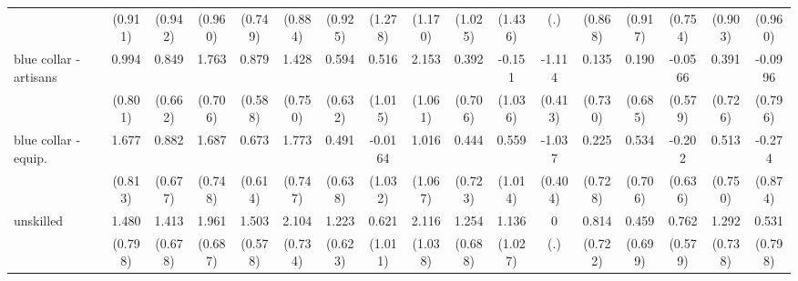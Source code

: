{\begin{tabular}{l*{16}{c}}
                    &     (0.911)         &     (0.942)         &     (0.960)         &     (0.749)         &     (0.884)         &     (0.925)         &     (1.278)         &     (1.170)         &     (1.025)         &     (1.436)         &         (.)         &     (0.868)         &     (0.917)         &     (0.754)         &     (0.903)         &     (0.960)         \\
[1em]
blue collar - artisans&       0.994         &       0.849         &       1.763\sym{*}  &       0.879         &       1.428         &       0.594         &       0.516         &       2.153\sym{*}  &       0.392         &      -0.151         &      -1.114\sym{**} &       0.135         &       0.190         &     -0.0566         &       0.391         &     -0.0996         \\
                    &     (0.801)         &     (0.662)         &     (0.706)         &     (0.588)         &     (0.750)         &     (0.632)         &     (1.015)         &     (1.061)         &     (0.706)         &     (1.036)         &     (0.413)         &     (0.730)         &     (0.685)         &     (0.579)         &     (0.726)         &     (0.796)         \\
[1em]
blue collar - equip.&       1.677\sym{*}  &       0.882         &       1.687\sym{*}  &       0.673         &       1.773\sym{*}  &       0.491         &     -0.0164         &       1.016         &       0.444         &       0.559         &      -1.037\sym{*}  &       0.225         &       0.534         &      -0.202         &       0.513         &      -0.274         \\
                    &     (0.813)         &     (0.677)         &     (0.748)         &     (0.614)         &     (0.747)         &     (0.638)         &     (1.032)         &     (1.067)         &     (0.723)         &     (1.014)         &     (0.404)         &     (0.728)         &     (0.706)         &     (0.636)         &     (0.750)         &     (0.874)         \\
[1em]
unskilled           &       1.480         &       1.413\sym{*}  &       1.961\sym{**} &       1.503\sym{**} &       2.104\sym{**} &       1.223\sym{*}  &       0.621         &       2.116\sym{*}  &       1.254         &       1.136         &           0         &       0.814         &       0.459         &       0.762         &       1.292         &       0.531         \\
                    &     (0.798)         &     (0.678)         &     (0.687)         &     (0.578)         &     (0.734)         &     (0.623)         &     (1.011)         &     (1.038)         &     (0.688)         &     (1.027)         &         (.)         &     (0.722)         &     (0.699)         &     (0.579)         &     (0.738)         &     (0.798)         \\

\end{tabular}}
